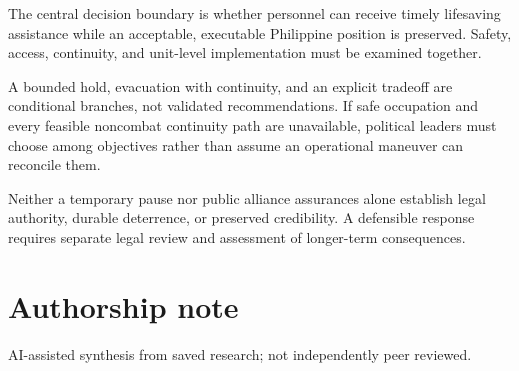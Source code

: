 \documentclass[11pt]{article}
\begin{document}
The central decision boundary is whether personnel can receive timely lifesaving assistance while an acceptable, executable Philippine position is preserved. Safety, access, continuity, and unit-level implementation must be examined together.

A bounded hold, evacuation with continuity, and an explicit tradeoff are conditional branches, not validated recommendations. If safe occupation and every feasible noncombat continuity path are unavailable, political leaders must choose among objectives rather than assume an operational maneuver can reconcile them.

Neither a temporary pause nor public alliance assurances alone establish legal authority, durable deterrence, or preserved credibility. A defensible response requires separate legal review and assessment of longer-term consequences.

\section*{Authorship note}
AI-assisted synthesis from saved research; not independently peer reviewed.
\end{document}
